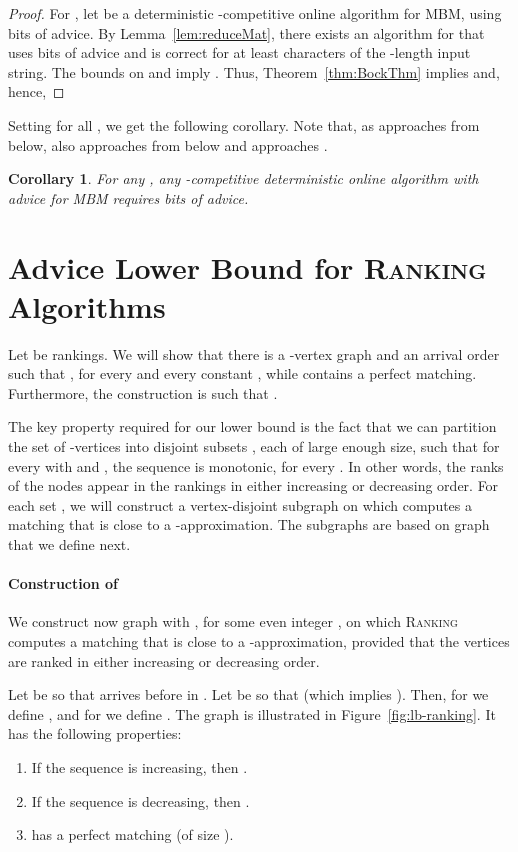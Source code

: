 \documentclass[a4paper]{article}
\newcommand{\Rank}{\textsc{Ranking}}
\newtheorem{corollary}{Corollary}
\begin{document}
\begin{proof}
  For , let  be a deterministic -competitive
  online algorithm for \textsc{MBM}, using  bits of advice.
  By Lemma~\ref{lem:reduceMat}, there exists an algorithm for  that uses
   bits of advice and is correct for at least  characters of the -length
  input string. The bounds on  and  imply
  . Thus, Theorem~\ref{thm:BockThm} implies
   and, hence,
  
\end{proof}

Setting  for all , we get the following corollary. Note that,
as  approaches  from below,  also approaches  from below and  approaches .

\begin{corollary} \label{cor:lb-advice}
  For any , any -competitive deterministic online algorithm with advice
  for \textsc{MBM} requires  bits of advice.
\end{corollary}

\section{Advice Lower Bound for \textsc{Ranking} Algorithms} \label{sec:lb-rank}
Let  be rankings.
We will show that there is a -vertex graph  and an arrival order  such that
, for every  and every constant
, while  contains a perfect matching. Furthermore, the construction is such that
.

The key property required for our lower bound is the fact that we can partition the set of -vertices
into disjoint subsets , each of large enough size, such that for every
 with  and , the sequence  is
monotonic, for every . In other words, the ranks of the nodes  appear
in the rankings  in either increasing or decreasing order. For each set ,
we will construct a vertex-disjoint subgraph  on which  computes a matching that is close to
a -approximation. The subgraphs  are based on graph  that we define next.

\paragraph*{Construction of }
We construct now graph  with , for some even integer ,
on which {\Rank} computes a matching that is close to a -approximation, provided that the 
vertices are ranked in either increasing or decreasing order.

Let  be so that  arrives before  in .
Let  be so that  (which implies ). Then, for 
we define , and for 
we define .
The graph  is illustrated in Figure~\ref{fig:lb-ranking}. It has the following properties:
\begin{enumerate}
 \item If the sequence  is increasing, then .
 \item If the sequence  is decreasing, then .
 \item  has a perfect matching (of size ).
\end{enumerate}
\end{document}
